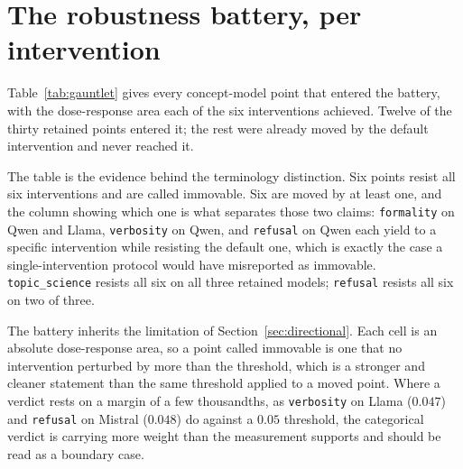 \documentclass{article}
\begin{document}
\section{The robustness battery, per intervention}
\label{app:gauntlet}

Table~\ref{tab:gauntlet} gives every concept-model point that entered the
battery, with the dose-response area each of the six interventions achieved.
Twelve of the thirty retained points entered it; the rest were already moved by
the default intervention and never reached it.

The table is the evidence behind the terminology distinction. Six points resist
all six interventions and are called immovable. Six are moved by at least one,
and the column showing which one is what separates those two claims:
\texttt{formality} on Qwen and Llama, \texttt{verbosity} on Qwen, and
\texttt{refusal} on Qwen each yield to a specific intervention while resisting
the default one, which is exactly the case a single-intervention protocol would
have misreported as immovable. \texttt{topic\_science} resists all six on all
three retained models; \texttt{refusal} resists all six on two of three.

The battery inherits the limitation of Section~\ref{sec:directional}. Each cell
is an absolute dose-response area, so a point called immovable is one that no
intervention perturbed by more than the threshold, which is a stronger and
cleaner statement than the same threshold applied to a moved point. Where a
verdict rests on a margin of a few thousandths, as \texttt{verbosity} on Llama
($0.047$) and \texttt{refusal} on Mistral ($0.048$) do against a $0.05$
threshold, the categorical verdict is carrying more weight than the measurement
supports and should be read as a boundary case.
\end{document}
